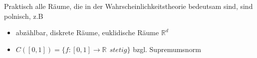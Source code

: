 Praktisch alle Räume, die in der Wahrscheinlichkeitstheorie bedeutsam sind, sind polnisch, z.B
\begin{itemize}
\item abzählbar, diskrete Räume, euklidische Räume $\mathbb{R}^{d}$
\item $C([0,1]) = \lbrace f:[0,1] \to \mathbb{R} \: \: stetig \rbrace$ bzgl. Supremumsnorm
\end{itemize}